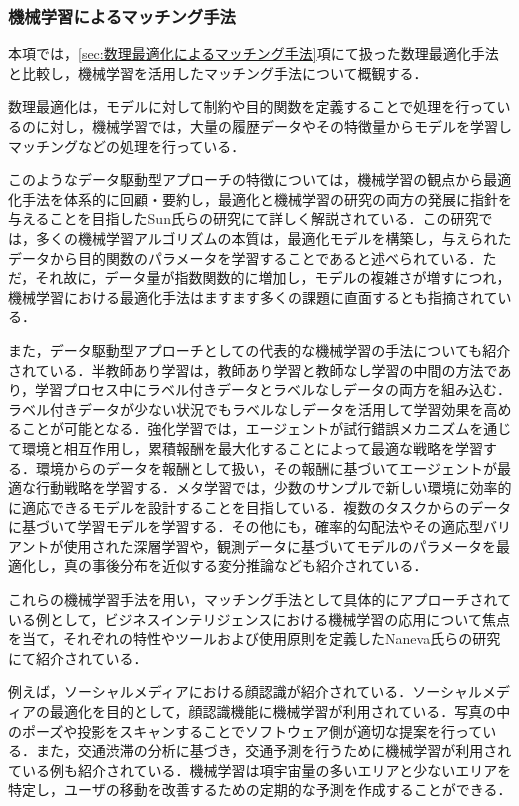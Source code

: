       \subsubsection{機械学習によるマッチング手法}
        \label{sec:機械学習によるマッチング手法}
          \par 本項では，\ref{sec:数理最適化によるマッチング手法}項にて扱った数理最適化手法と比較し，機械学習を活用したマッチング手法について概観する．
          \par 数理最適化は，モデルに対して制約や目的関数を定義することで処理を行っているのに対し，機械学習では，大量の履歴データやその特徴量からモデルを学習しマッチングなどの処理を行っている．
          \par このようなデータ駆動型アプローチの特徴については，機械学習の観点から最適化手法を体系的に回顧・要約し，最適化と機械学習の研究の両方の発展に指針を与えることを目指したSun氏らの研究にて詳しく解説されている．この研究では，多くの機械学習アルゴリズムの本質は，最適化モデルを構築し，与えられたデータから目的関数のパラメータを学習することであると述べられている．ただ，それ故に，データ量が指数関数的に増加し，モデルの複雑さが増すにつれ，機械学習における最適化手法はますます多くの課題に直面するとも指摘されている．
          \par また，データ駆動型アプローチとしての代表的な機械学習の手法についても紹介されている．半教師あり学習は，教師あり学習と教師なし学習の中間の方法であり，学習プロセス中にラベル付きデータとラベルなしデータの両方を組み込む．ラベル付きデータが少ない状況でもラベルなしデータを活用して学習効果を高めることが可能となる．強化学習では，エージェントが試行錯誤メカニズムを通じて環境と相互作用し，累積報酬を最大化することによって最適な戦略を学習する．環境からのデータを報酬として扱い，その報酬に基づいてエージェントが最適な行動戦略を学習する．メタ学習では，少数のサンプルで新しい環境に効率的に適応できるモデルを設計することを目指している．複数のタスクからのデータに基づいて学習モデルを学習する．その他にも，確率的勾配法やその適応型バリアントが使用された深層学習や，観測データに基づいてモデルのパラメータを最適化し，真の事後分布を近似する変分推論なども紹介されている．
          \par これらの機械学習手法を用い，マッチング手法として具体的にアプローチされている例として，ビジネスインテリジェンスにおける機械学習の応用について焦点を当て，それぞれの特性やツールおよび使用原則を定義したNaneva氏らの研究にて紹介されている．
          \par 例えば，ソーシャルメディアにおける顔認識が紹介されている．ソーシャルメディアの最適化を目的として，顔認識機能に機械学習が利用されている．写真の中のポーズや投影をスキャンすることでソフトウェア側が適切な提案を行っている．また，交通渋滞の分析に基づき，交通予測を行うために機械学習が利用されている例も紹介されている．機械学習は項宇宙量の多いエリアと少ないエリアを特定し，ユーザの移動を改善するための定期的な予測を作成することができる．
